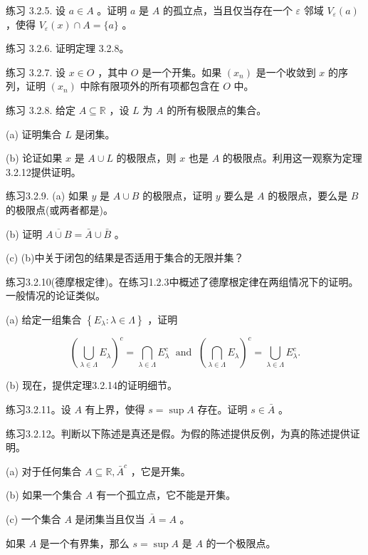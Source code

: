 练习 3.2.5. 设 \(a \in  A\) 。证明 \(a\) 是 \(A\) 的孤立点，当且仅当存在一个 \(\varepsilon\) 邻域 \({V}_{\varepsilon }\left( a\right)\) ，使得 \({V}_{\varepsilon }\left( x\right)  \cap  A = \{ a\}\) 。

练习 3.2.6. 证明定理 3.2.8。

练习 3.2.7. 设 \(x \in  O\) ，其中 \(O\) 是一个开集。如果 \(\left( {x}_{n}\right)\) 是一个收敛到 \(x\) 的序列，证明 \(\left( {x}_{n}\right)\) 中除有限项外的所有项都包含在 \(O\) 中。

练习 3.2.8. 给定 \(A \subseteq  \mathbb{R}\) ，设 \(L\) 为 \(A\) 的所有极限点的集合。

(a) 证明集合 \(L\) 是闭集。

(b) 论证如果 \(x\) 是 \(A \cup  L\) 的极限点，则 \(x\) 也是 \(A\) 的极限点。利用这一观察为定理3.2.12提供证明。

练习3.2.9. (a) 如果 \(y\) 是 \(A \cup  B\) 的极限点，证明 \(y\) 要么是 \(A\) 的极限点，要么是 \(B\) 的极限点(或两者都是)。

(b) 证明 \(\overline{A \cup  B} = \bar{A} \cup  \bar{B}\) 。

(c) (b)中关于闭包的结果是否适用于集合的无限并集？

练习3.2.10(德摩根定律)。在练习1.2.3中概述了德摩根定律在两组情况下的证明。一般情况的论证类似。

(a) 给定一组集合 \(\left\{  {{E}_{\lambda } : \lambda  \in  \Lambda }\right\}\) ，证明

\[
{\left( \mathop{\bigcup }\limits_{{\lambda  \in  \Lambda }}{E}_{\lambda }\right) }^{c} = \mathop{\bigcap }\limits_{{\lambda  \in  \Lambda }}{E}_{\lambda }^{c}\;\text{ and }\;{\left( \mathop{\bigcap }\limits_{{\lambda  \in  \Lambda }}{E}_{\lambda }\right) }^{c} = \mathop{\bigcup }\limits_{{\lambda  \in  \Lambda }}{E}_{\lambda }^{c}.
\]

(b) 现在，提供定理3.2.14的证明细节。

练习3.2.11。设 \(A\) 有上界，使得 \(s = \sup A\) 存在。证明 \(s \in  \bar{A}\) 。

练习3.2.12。判断以下陈述是真还是假。为假的陈述提供反例，为真的陈述提供证明。

(a) 对于任何集合 \(A \subseteq  \mathbb{R},{\bar{A}}^{c}\) ，它是开集。

(b) 如果一个集合 \(A\) 有一个孤立点，它不能是开集。

(c) 一个集合 \(A\) 是闭集当且仅当 \(\bar{A} = A\) 。

如果 \(A\) 是一个有界集，那么 \(s = \sup A\) 是 \(A\) 的一个极限点。

